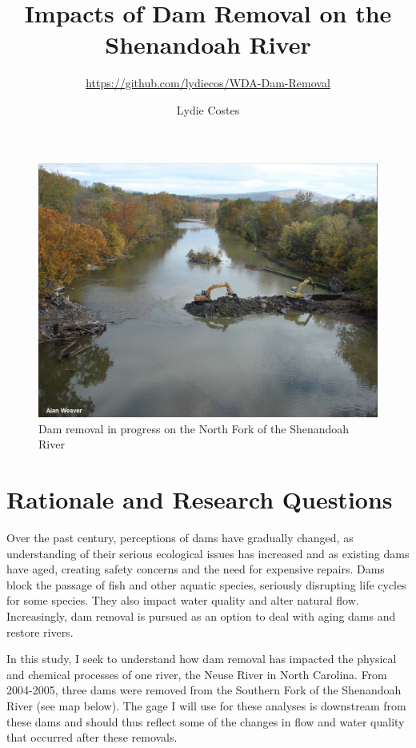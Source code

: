 \documentclass[
  12pt,
]{article}
\title{Impacts of Dam Removal on the Shenandoah River}
\subtitle{\url{https://github.com/lydiecos/WDA-Dam-Removal}}
\author{Lydie Costes}
\date{}
\begin{document}
\maketitle

\begin{figure}
\centering
\includegraphics{../Figures-and-Maps/riverton-dam-removal.jpeg}
\caption{Dam removal in progress on the North Fork of the Shenandoah
River}
\end{figure}

\newpage
\tableofcontents 
\newpage
\listoftables 
\listoffigures 
\newpage

\hypertarget{rationale-and-research-questions}{%
\section{Rationale and Research
Questions}\label{rationale-and-research-questions}}

Over the past century, perceptions of dams have gradually changed, as
understanding of their serious ecological issues has increased and as
existing dams have aged, creating safety concerns and the need for
expensive repairs. Dams block the passage of fish and other aquatic
species, seriously disrupting life cycles for some species. They also
impact water quality and alter natural flow. Increasingly, dam removal
is pursued as an option to deal with aging dams and restore rivers.

In this study, I seek to understand how dam removal has impacted the
physical and chemical processes of one river, the Neuse River in North
Carolina. From 2004-2005, three dams were removed from the Southern Fork
of the Shenandoah River (see map below). The gage I will use for these
analyses is downstream from these dams and should thus reflect some of
the changes in flow and water quality that occurred after these
removals.
\end{document}
